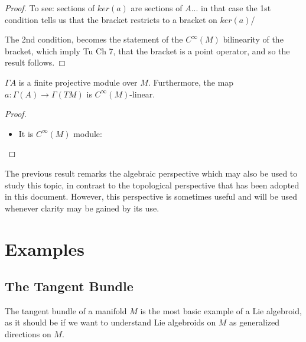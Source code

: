 \begin{proof}
To see: sections of $ker(a)$ are sections of $A$... in that case the 1st condition tells us that the bracket restricts to a bracket on $ker(a)$/

The 2nd condition, becomes the statement of the $C^\infty(M)$ bilinearity of the bracket, which imply Tu Ch 7, that the bracket is a point operator, and so the result follows.
\end{proof}

\begin{proposition}
$\Gamma A$ is a finite projective module over $M$. Furthermore, the map $a: \Gamma(A) \to \Gamma(TM)$ is $C^\infty(M)$-linear.
\end{proposition}
\begin{proof}
    \begin{itemize}
    \item It is $C^\infty(M)$ module:
    \end{itemize}
\end{proof}

The previous result remarks the algebraic perspective which may also be used to study this topic, in contrast to the topological perspective that has been adopted in this document. However, this perspective is sometimes useful and will be used whenever clarity may be gained by its use.

\section{Examples}

\subsection{The Tangent Bundle}

The tangent bundle of a manifold $M$ is the most basic example of a Lie algebroid, as it should be if we want to understand Lie algebroids on $M$ as generalized directions on $M$.

